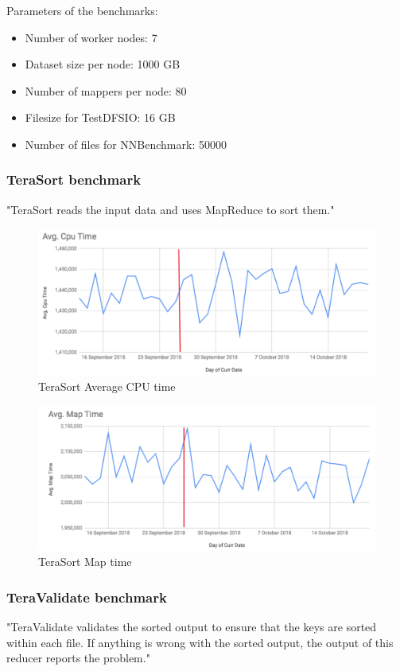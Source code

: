 \noindent Parameters of the benchmarks: 
\begin{itemize}
	\setlength{\itemsep}{1pt}
	\item Number of worker nodes: 7
	\item Dataset size per node: 1000 GB
	\item Number of mappers per node: 80
	\item Filesize for TestDFSIO: 16 GB
	\item Number of files for NNBenchmark: 50000
\end{itemize}

\subsubsection{TeraSort benchmark}
"TeraSort reads the input data and uses MapReduce to sort them." \cite{terasort}

\begin{figure}[H]
	\includegraphics[width=125mm, keepaspectratio]{figures/terasort_cpu.png}
	\centering
	\caption{TeraSort Average CPU time}
\end{figure}
\begin{figure}[H]
	\includegraphics[width=125mm, keepaspectratio]{figures/terasort_map.png}
	\centering
	\caption{TeraSort Map time}
\end{figure}
\subsubsection{TeraValidate benchmark}
"TeraValidate validates the sorted output to ensure that the keys are sorted within each file. If anything is wrong with the sorted output, the output of this reducer reports the problem." \cite{terasort}

